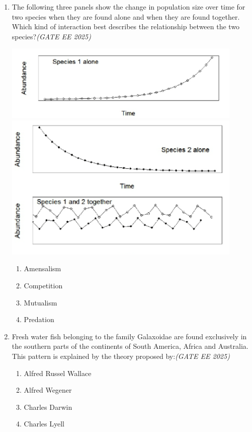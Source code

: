 \documentclass[11pt,a4paper]{article}
\begin{document}
\begin{enumerate}[leftmargin=*,label=\textbf{Q.\arabic*},resume]
\item The following three panels show the change in population size over time for two species when they are found alone and when they are found together. Which kind of interaction best describes the relationship between the two species?\hfill \textit{(GATE EE 2025)}
\vspace{1em}
\begin{center}
    \includegraphics[width=0.9\textwidth]{ImageQ32a.png}  
    \includegraphics[width=0.9\textwidth]{ImageQ32b.png}  
\end{center}

\vspace{1em}
\begin{multicols}{2}
\begin{enumerate}[label=(\Alph*)]
\item Amensalism
\item Competition
\item Mutualism
\item Predation
\end{enumerate}
\end{multicols}

\item Fresh water fish belonging to the family Galaxoidae are found exclusively in the southern parts of the continents of South America, Africa and Australia. This pattern is explained by the theory proposed by:\hfill \textit{(GATE EE 2025)}
\begin{multicols}{2}
\begin{enumerate}[label=(\Alph*)]
\item Alfred Russel Wallace
\item Alfred Wegener
\item Charles Darwin
\item Charles Lyell
\end{enumerate}
\end{multicols}


\end{enumerate}
\end{document}
